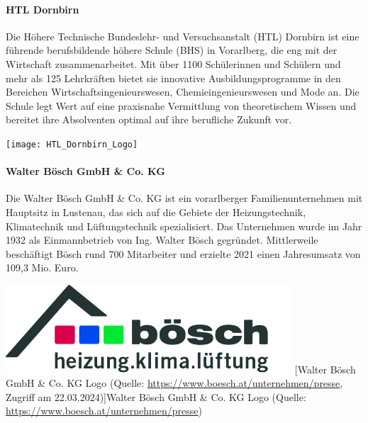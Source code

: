 \paragraph{HTL Dornbirn}
\vspace{1ex}
\begin{minipage}{0.6\textwidth}
    Die Höhere Technische Bundeslehr- und Versuchsanstalt (HTL) Dornbirn ist eine führende berufsbildende höhere Schule (BHS) in Vorarlberg, die eng mit der Wirtschaft zusammenarbeitet. Mit über 1100 Schülerinnen und Schülern und mehr als 125 Lehrkräften bietet sie innovative Ausbildungsprogramme in den Bereichen Wirtschaftsingenieurswesen, Chemieingenieurswesen und Mode an. Die Schule legt Wert auf eine praxisnahe Vermittlung von theoretischem Wissen und bereitet ihre Absolventen optimal auf ihre berufliche Zukunft vor.
\end{minipage}%
\hfill
\begin{minipage}{0.37\textwidth}
	\centering	
	\texttt{[image: HTL\_Dornbirn\_Logo]}
\end{minipage}
\vspace{1ex}

\paragraph{Walter Bösch GmbH \& Co. KG}
\vspace{1ex}
\begin{minipage}{0.6\textwidth}
Die Walter Bösch GmbH \& Co. KG ist ein vorarlberger Familienunternehmen mit Hauptsitz in Lustenau, das sich auf die Gebiete der Heizungstechnik, Klimatechnik und Lüftungstechnik spezialisiert. Das Unternehmen wurde im Jahr 1932 als Einmannbetrieb von Ing. Walter Bösch gegründet. Mittlerweile beschäftigt Bösch rund 700 Mitarbeiter und erzielte 2021 einen Jahresumsatz von 109,3 Mio. Euro. \cite[vgl.][]{walter_boesch:o.J.}
\end{minipage}%
\hfill
\begin{minipage}{0.37\textwidth}
	\centering	
	\includegraphics[width=0.8\textwidth]{boesch_logo_original}
	[Walter Bösch GmbH \& Co. KG Logo (Quelle: \url{https://www.boesch.at/unternehmen/presse}, Zugriff am 22.03.2024)]{Walter Bösch GmbH \& Co. KG Logo (Quelle: \url{https://www.boesch.at/unternehmen/presse}) \label{fig:boesch_logo}}
\end{minipage}

